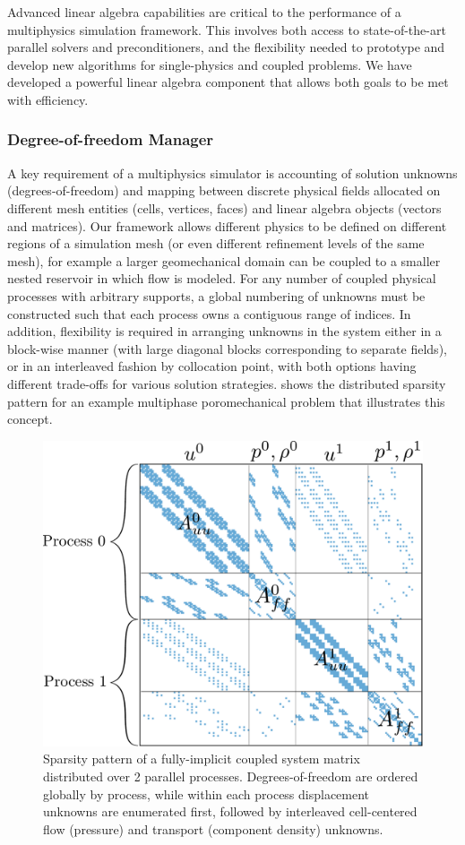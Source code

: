 Advanced linear algebra capabilities are critical to the performance of a multiphysics simulation framework.   This involves both access to state-of-the-art parallel solvers and preconditioners, and the flexibility needed to prototype and develop new algorithms for single-physics and coupled problems.   We have developed a powerful linear algebra component that allows both goals to be met with efficiency.

\subsubsection{Degree-of-freedom Manager}

A key requirement of a multiphysics simulator is accounting of solution unknowns (degrees-of-freedom) and mapping between discrete physical fields allocated on different mesh entities (cells, vertices, faces) and linear algebra objects (vectors and matrices).   Our framework allows different physics to be defined on different regions of a simulation mesh (or even different refinement levels of the same mesh), for example a larger geomechanical domain can be coupled to a smaller nested reservoir in which flow is modeled.   For any number of coupled physical processes with arbitrary supports, a global numbering of unknowns must be constructed such that each process owns a contiguous range of indices.   In addition, flexibility is required in arranging unknowns in the system either in a block-wise manner (with large diagonal blocks corresponding to separate fields), or in an interleaved fashion by collocation point, with both options having different trade-offs for various solution strategies.    shows the distributed sparsity pattern for an example multiphase poromechanical problem that illustrates this concept.

\begin{figure} [htbp]
  \centerline{\includegraphics[width=0.5\linewidth]{figs/coupled_system_parallel_sparsity}}
  \caption[Sparsity pattern of a distributed multi-physics system matrix]{\label{fig:coupled_sparsity_parallel} Sparsity pattern of a fully-implicit coupled system matrix distributed over 2 parallel processes.   Degrees-of-freedom are ordered globally by process, while within each process displacement unknowns are enumerated first, followed by interleaved cell-centered flow (pressure) and transport (component density) unknowns.}
\end{figure}

